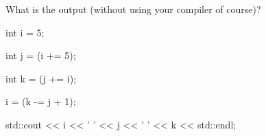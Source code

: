 What is the output (without using your compiler of course)?

\begin{console}

int i = 5;

int j = (i += 5);

int k = (j += i);

i = (k -= j + 1);

std::cout << i << ' ' << j << ' ' << k << std::endl;

\end{console}


